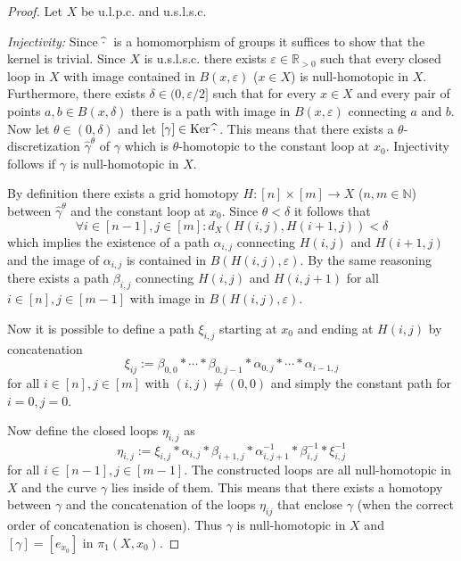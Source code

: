 \documentclass[a4paper, 11pt, twoside]{article}
\newcommand{\R}[0]{\mathbb{R}}
\newcommand{\N}[0]{\mathbb{N}}
\theoremstyle{break}
\theoremstyle{break}
\begin{document}
\begin{proof}
  Let $X$ be u.l.p.c. and u.s.l.s.c.

  \textit{Injectivity:} Since $\widehat{\cdot}\hspace*{2px}$ is a homomorphism of groups it suffices to show that the kernel is trivial.
  Since $X$ is u.s.l.s.c. there exists $\varepsilon \in \R_{>0}$ 
  such that every closed loop in $X$ with image contained in $B(x, \varepsilon)$ ($x\in X$) is null-homotopic in $X$. Furthermore,
  there exists $\delta \in (0, \varepsilon/2]$ such that for every $x \in X$ and every pair of points $a,b \in B(x, \delta)$ there is a path with image in $B(x, \varepsilon)$ connecting $a$ and $b$.
  Now let $\theta \in (0, \delta)$ and let $[\gamma] \in {\rm Ker} \hspace*{2px} \widehat{\cdot}\hspace*{2px}$. 
  This means that there exists a $\theta$-discretization $\widehat{\gamma}^{\theta}$ of $\gamma$ which is $\theta$-homotopic to the constant loop at $x_0$.
  Injectivity follows if $\gamma$ is null-homotopic in $X$.
  
  By definition there exists a grid homotopy $H\colon [n] \times [m] \to X$ ($n,m\in\N$) between $\widehat{\gamma}^{\theta}$ and the constant loop at $x_0$.
  Since $\theta < \delta$ it follows that 
  \begin{equation*}
    \forall i \in [n-1], j \in [m]\colon d_X(H(i,j), H(i+1,j)) < \delta
  \end{equation*}
  which implies the existence of a path $\alpha_{i,j}$ connecting $H(i,j)$ and $H(i+1,j)$ and
  the image of $\alpha_{i,j}$ is contained in $B(H(i,j), \varepsilon)$.
  By the same reasoning there exists a path $\beta_{i,j}$ connecting $H(i,j)$ and $H(i,j+1)$ for all $i \in [n], j \in [m-1]$ with image in $B(H(i,j), \varepsilon)$.

  Now it is possible to define a path $\xi_{i,j}$ starting at $x_0$ and ending at $H(i,j)$ by concatenation
  \begin{equation*}
    \xi_{ij} := \beta_{0,0} * \cdots * \beta_{0,j-1} * \alpha_{0,j} * \cdots * \alpha_{i-1,j}
  \end{equation*}
  for all $i \in [n], j \in [m]$ with $(i,j) \neq (0,0)$ and simply the constant path for $i = 0, j = 0$. 
  
  Now define the closed loops $\eta_{i,j}$ as
  \begin{equation*}
    \eta_{i,j} := \xi_{i,j} * \alpha_{i,j} * \beta_{i+1,j} * \alpha^{-1}_{i,j+1} * \beta^{-1}_{i,j} * \xi^{-1}_{i,j}
  \end{equation*}
  for all $i \in [n-1], j \in [m-1]$.
  The constructed loops are all null-homotopic in $X$ and the curve $\gamma$ lies inside of them. 
  This means that there exists a homotopy between $\gamma$ and the concatenation of the loops $\eta_{ij}$ that enclose $\gamma$ (when the correct order of concatenation is chosen).
  Thus $\gamma$ is null-homotopic in $X$ and $[\gamma] = [e_{x_0}]$ in $\pi_1(X, x_0)$.


\end{proof}
\end{document}
